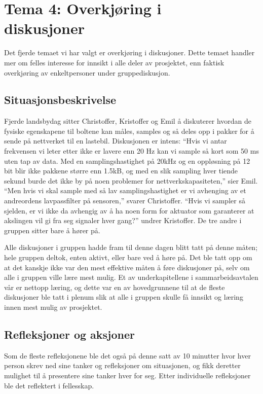 \chapter{Tema 4: Overkjøring i\\diskusjoner}
Det fjerde temaet vi har valgt er overkjøring i diskusjoner.
Dette temaet handler mer om felles interesse for innsikt i alle deler av
prosjektet, enn faktisk overkjøring av enkeltpersoner under gruppediskusjon.

\section {Situasjonsbeskrivelse}
Fjerde landsbydag sitter Christoffer, Kristoffer og Emil å diskuterer hvordan de fysiske egenskapene til boltene kan måles, samples og så deles opp i pakker for å sende på nettverket til en lastebil. Diskusjonen er intens: ``Hvis vi antar frekvensen vi leter etter ikke er lavere enn 20 Hz kan vi sample så kort som 50 ms uten tap av data. Med en samplingshastighet på 20kHz og en oppløsning på 12 bit blir ikke pakkene større enn 1.5kB, og med en slik sampling hver tiende sekund burde det ikke by på noen problemer for nettverkskapasiteten,'' sier Emil. ``Men hvis vi skal sample med så lav samplingshastighet er vi avhenging av et andreordens lavpassfilter på sensoren,'' svarer Christoffer. ``Hvis vi sampler så sjelden, er vi ikke da avhengig av å ha noen form for aktuator som garanterer at akslingen vil gi fra seg signaler hver gang?'' undrer Kristoffer. De tre andre i gruppen sitter bare å hører på. 

Alle diskusjoner i gruppen hadde fram til denne dagen blitt tatt på denne måten; hele gruppen deltok, enten aktivt, eller bare ved å høre på. Det ble tatt opp om at det kanskje ikke var den mest effektive måten å føre diskusjoner på, selv om alle i gruppen ville lære mest mulig. Et av underkapitellene i sammarbeidsavtalen vår er nettopp læring, og dette var en av hovedgrunnene til at de fleste diskusjoner ble tatt i plenum slik at alle i gruppen skulle få innsikt og læring innen mest mulig av prosjektet.

\section{Refleksjoner og aksjoner}
Som de fleste refleksjonene ble det også på denne satt av 10 minutter hvor hver person skrev ned sine tanker og refleksjoner om situasjonen, og fikk deretter mulighet til å presentere sine tanker hver for seg. Etter individuelle refleksjoner ble det reflektert i fellesskap.

